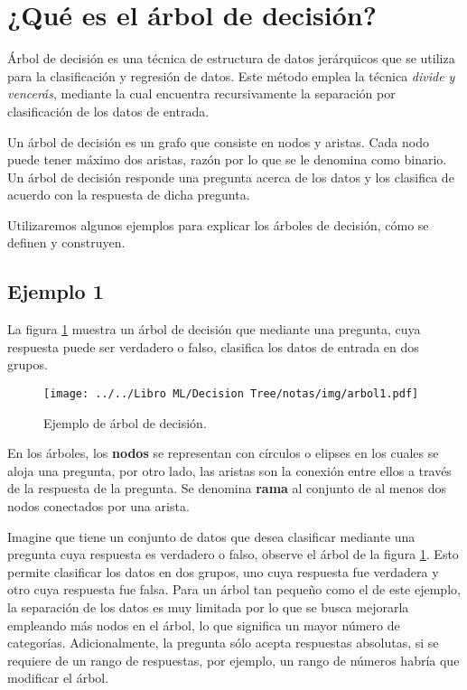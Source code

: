 \documentclass[
10pt, %
a4paper, %
]{article}
\begin{document}

\section{¿Qué es el árbol de decisión?}


Árbol de decisión es una técnica de estructura de datos jerárquicos que se utiliza para la clasificación y regresión de datos. Este método
emplea la técnica \textit{divide y vencerás}, mediante la cual encuentra recursivamente la separación por clasificación de los datos de entrada. 

Un árbol de decisión es un grafo que consiste en nodos y aristas. Cada nodo puede tener máximo dos aristas, razón por lo que se le denomina como binario.
Un árbol de decisión responde una pregunta acerca de los datos y los clasifica de acuerdo con la respuesta de dicha pregunta. 

Utilizaremos algunos ejemplos para explicar los árboles de decisión, cómo se definen y construyen.

\subsection{Ejemplo 1}

La figura \ref{fig:arbol1} muestra un árbol de decisión que mediante una pregunta, cuya respuesta puede ser verdadero o falso, clasifica los datos de entrada 
en dos grupos.

\begin{figure}[H]
	\centering
	\texttt{[image: ../../Libro ML/Decision Tree/notas/img/arbol1.pdf]}
	\caption{Ejemplo de árbol de decisión.}
	\label{fig:arbol1}
\end{figure}

En los árboles, los \textbf{nodos} se representan con círculos o elipses en los cuales se aloja una pregunta, por otro lado, las aristas son la conexión 
entre ellos a través de la respuesta de la pregunta. Se denomina \textbf{rama} al conjunto de al menos dos nodos conectados por una arista.

Imagine que tiene un conjunto de datos que desea clasificar mediante una pregunta cuya respuesta es verdadero o falso, observe el árbol de la figura \ref{fig:arbol1}. 
Esto permite clasificar los datos en dos grupos, uno cuya respuesta fue verdadera y otro cuya respuesta fue falsa. Para un árbol tan pequeño como el de este ejemplo, 
la separación de los datos es muy limitada por lo que se busca mejorarla empleando más nodos en el árbol, lo que significa un mayor número de categorías.
Adicionalmente, la pregunta sólo acepta respuestas absolutas, si se requiere de un rango de respuestas, por ejemplo, un rango de números habría que modificar 
el árbol.
\end{document}
